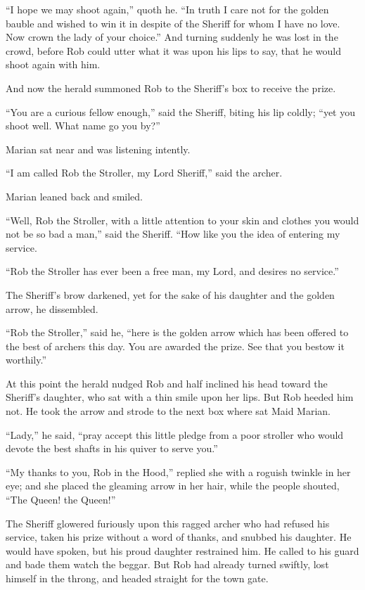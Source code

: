 ``I hope we may shoot again,'' quoth he. ``In truth I care not for the
golden bauble and wished to win it in despite of the Sheriff for whom I
have no love. Now crown the lady of your choice.'' And turning suddenly
he was lost in the crowd, before Rob could utter what it was upon his
lips to say, that he would shoot again with him.

And now the herald summoned Rob to the Sheriff's box to receive the
prize.

``You are a curious fellow enough,'' said the Sheriff, biting his lip
coldly; ``yet you shoot well. What name go you by?''

Marian sat near and was listening intently.

``I am called Rob the Stroller, my Lord Sheriff,'' said the archer.

Marian leaned back and smiled.

``Well, Rob the Stroller, with a little attention to your skin and
clothes you would not be so bad a man,'' said the Sheriff. ``How like
you the idea of entering my service.

``Rob the Stroller has ever been a free man, my Lord, and desires no
service.''

The Sheriff's brow darkened, yet for the sake of his daughter and the
golden arrow, he dissembled.

``Rob the Stroller,'' said he, ``here is the golden arrow which has been
offered to the best of archers this day. You are awarded the prize. See
that you bestow it worthily.''

At this point the herald nudged Rob and half inclined his head toward
the Sheriff's daughter, who sat with a thin smile upon her lips. But Rob
heeded him not. He took the arrow and strode to the next box where sat
Maid Marian.

``Lady,'' he said, ``pray accept this little pledge from a poor stroller
who would devote the best shafts in his quiver to serve you.''

``My thanks to you, Rob in the Hood,'' replied she with a roguish
twinkle in her eye; and she placed the gleaming arrow in her hair, while
the people shouted, ``The Queen! the Queen!''

The Sheriff glowered furiously upon this ragged archer who had refused
his service, taken his prize without a word of thanks, and snubbed his
daughter. He would have spoken, but his proud daughter restrained him.
He called to his guard and bade them watch the beggar. But Rob had
already turned swiftly, lost himself in the throng, and headed straight
for the town gate.

